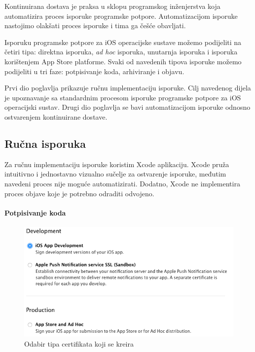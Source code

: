 \documentclass[times, utf8, diplomski, numeric]{fer}
\begin{document}
\begin{appendices}
Kontinuirana dostava je praksa u sklopu programskog inženjerstva koja automatizira proces isporuke programske potpore. Automatizacijom isporuke nastojimo olakšati proces isporuke i tima ga češće obavljati.

Isporuku programske potpore za iOS operacijske sustave možemo podijeliti na četiri tipa: direktna isporuka, \textit{ad hoc} isporuka, unutarnja isporuka i isporuka korištenjem App Store platforme. Svaki od navedenih tipova isporuke možemo podijeliti u tri faze: potpisivanje koda, arhiviranje i objavu.

Prvi dio poglavlja prikazuje ručnu implementaciju isporuke. Cilj navedenog dijela je upoznavanje sa standardnim procesom isporuke programske potpore za iOS operacijski sustav. Drugi dio poglavlja se bavi automatizacijom isporuke odnosno ostvarenjem kontinuirane dostave.

\subsection{Ručna isporuka} \label{header:RučnaImplementacijaIsporuke}

Za ručnu implementaciju isporuke koristim Xcode aplikaciju. Xcode pruža intuitivno i jednostavno vizualno sučelje za ostvarenje isporuke, međutim navedeni proces nije moguće automatizirati. Dodatno, Xcode ne implementira proces objave koje je potrebno odraditi odvojeno.

\paragraph{Potpisivanje koda} \label{header:dodatak:RucnoPotpisivanjaKoda}

\begin{figure}[b!]
\centering
\includegraphics[scale=0.4]{AppleDeveloperCertificateCreation}
\caption{Odabir tipa certifikata koji se kreira}
\label{fig:AppleDeveloperCertificateCreation}
\end{figure}


\end{appendices}
\end{document}
